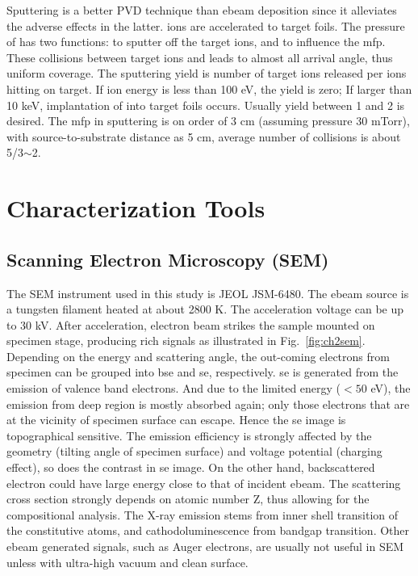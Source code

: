 Sputtering is a better PVD technique than \gls{ebeam} deposition since it alleviates the adverse effects in the latter.  ions are accelerated to target foils. The pressure of  has two functions: to sputter off the target ions, and to influence the \gls{mfp}. These collisions between target ions and  leads to almost all arrival angle, thus uniform coverage. The sputtering yield is number of target ions released per ions hitting on target. If  ion energy is less than 100 eV, the yield is zero; If larger than 10 keV, implantation of  into target foils occurs. Usually yield between 1 and 2 is desired. The \gls{mfp} in sputtering is on order of 3 cm (assuming pressure 30 mTorr), with source-to-substrate distance as 5 cm, average number of collisions is about 5/3$\sim$2. 

\section{Characterization Tools}
\subsection{Scanning Electron Microscopy (SEM)}\label{sec:sem}

The SEM instrument used in this study is JEOL JSM-6480. The \gls{ebeam} source is a tungsten filament heated at about 2800 K.\cite{jeolsem} The acceleration voltage can be up to 30 kV. After acceleration, electron beam strikes the sample mounted on specimen stage, producing rich signals as illustrated in Fig.~\ref{fig:ch2sem}. Depending on the energy and scattering angle, the out-coming electrons from specimen can be grouped into \gls{bse} and \gls{se}, respectively. \gls{se} is generated from the emission of valence band electrons. And due to the limited energy ($<50$ eV), the emission from deep region is mostly absorbed again; only those electrons that are at the vicinity of specimen surface can escape. Hence the \gls{se} image is topographical sensitive. The emission efficiency is strongly affected by the geometry (tilting angle of specimen surface) and voltage potential (charging effect), so does the contrast in \gls{se} image. On the other hand, backscattered electron could have large energy close to that of incident \gls{ebeam}. The scattering cross section strongly depends on atomic number Z, thus allowing for the compositional analysis. The X-ray emission stems from inner shell transition of the constitutive atoms, and cathodoluminescence from bandgap transition. Other \gls{ebeam} generated signals, such as Auger electrons, are usually not useful in SEM unless with ultra-high vacuum and clean surface.


